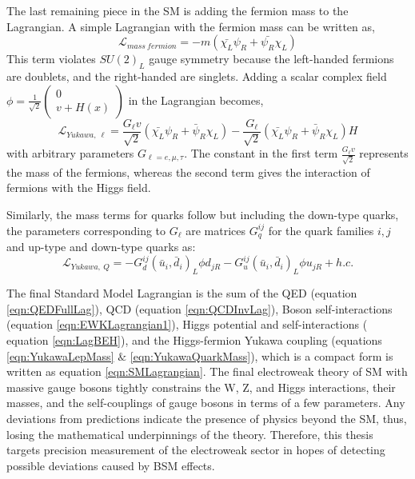 The last remaining piece in the SM is adding the fermion mass to the Lagrangian. A simple Lagrangian with the fermion mass can be written as, 
\begin{equation}
\mathcal{L}_{mass~fermion} = -m(\bar{\chi_{L}}\psi_{R} + \bar{\psi_{R}}\chi_{L})
\label{eqn:FermMass}
\end{equation}
This term violates $SU(2)_{L}$ gauge symmetry because the left-handed fermions are doublets, and the right-handed are singlets. Adding a scalar complex field $\phi =\frac{1}{\sqrt{2}} \begin{pmatrix} 0 \\ v+ H(x) \end{pmatrix}$ in the Lagrangian becomes, 
\begin{equation}
\mathcal{L}_{Yukawa,~\ell} = \frac{G_{\ell}v}{\sqrt{2}} (\bar{\chi_{L}}\psi_{R} + \bar{\psi}_{R}\chi_{L} ) - \frac{G_{\ell}}{\sqrt{2}} (\bar{\chi_{L}}\psi_{R} + \bar{\psi}_{R}\chi_{L} )H
\label{eqn:YukawaLepMass}
\end{equation}
with arbitrary parameters $G_{\ell =e,\mu,\tau}$. The constant in the first term $\frac{G_{\ell}v}{\sqrt{2}}$ represents the mass of the fermions, whereas the second term gives the interaction of fermions with the Higgs field. 

Similarly, the mass terms for quarks follow but including the down-type quarks, the parameters corresponding to $G_{\ell}$ are matrices $G^{ij}_{q}$ for the quark families $i,j$ and up-type and down-type quarks as:
\begin{equation}
\mathcal{L}_{Yukawa,~Q} = -G^{ij}_{d}(\bar{u}_{i} , \bar{d}_{i} )_{L} \phi d_{jR} - G^{ij}_{u}(\bar{u}_{i} , \bar{d}_{i} )_{L} \phi u_{jR} + h.c.
\label{eqn:YukawaQuarkMass}
\end{equation}

The final Standard Model Lagrangian is the sum of the QED (equation \ref{eqn:QEDFullLag}), QCD (equation \ref{eqn:QCDInvLag}), Boson self-interactions (equation \ref{eqn:EWKLagrangian1}), Higgs potential and self-interactions ( equation \ref{eqn:LagBEH}), and the Higgs-fermion Yukawa coupling (equations \ref{eqn:YukawaLepMass} $\&$ \ref{eqn:YukawaQuarkMass}), which is a compact form is written as equation \ref{eqn:SMLagrangian}. The final electroweak theory of SM with massive gauge bosons tightly constrains the W, Z, and Higgs interactions, their masses, and the self-couplings of gauge bosons in terms of a few parameters. Any deviations from predictions indicate the presence of physics beyond the SM, thus, losing the mathematical underpinnings of the theory. Therefore, this thesis targets precision measurement of the electroweak sector in hopes of detecting  possible deviations caused by BSM effects.